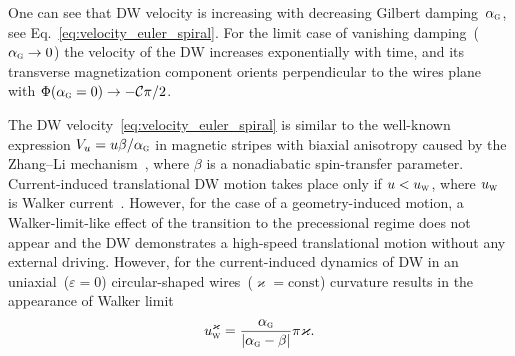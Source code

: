 One can see that DW velocity is increasing with decreasing Gilbert damping~$\alpha_\textsc{g}$, see Eq.~\eqref{eq:velocity_euler_spiral}. For the limit case of vanishing damping~($\alpha_\textsc{g}\to0$) the velocity of the DW increases exponentially with time, and its transverse magnetization component orients perpendicular to the wires plane with $\Phi(\alpha_\textsc{g}=0)\to-\mathcal{C}\pi/2$.

The DW velocity~\eqref{eq:velocity_euler_spiral} is similar to the well-known expression $V_u = u \beta/\alpha_\textsc{g}$ in magnetic stripes with biaxial anisotropy caused by the Zhang--Li mechanism~\cite{Bazaliy98,Zhang04}, where $\beta$ is a nonadiabatic spin-transfer parameter. Current-induced translational DW motion takes place only if $u<u_\textsc{w}$, where $u_\textsc{w}$ is Walker current~\cite{Thiaville05}. However, for the case of a geometry-induced motion, a Walker-limit-like effect of the transition to the precessional regime does not appear and the DW demonstrates a high-speed translational motion without any external driving. However, for the current-induced dynamics of DW in an uniaxial~($\varepsilon=0$) circular-shaped wires~($\varkappa=\text{const}$) curvature results in the appearance of Walker limit~\cite{Yershov16}
\begin{equation}
u_\textsc{w}^\varkappa=\frac{\alpha_\textsc{g}}{|\alpha_\textsc{g}-\beta|}\pi\varkappa.
\end{equation}


